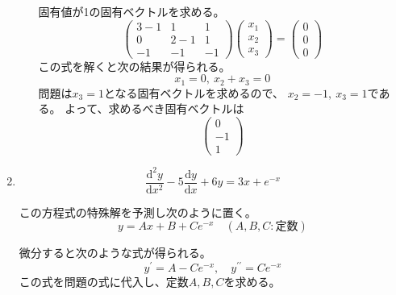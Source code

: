 \documentclass[12pt,b5paper]{ltjsarticle}
\begin{document}
\begin{enumerate}
\begin{enumerate}
            固有値が1の固有ベクトルを求める。
            \begin{equation}
             \begin{pmatrix} 3-1 & 1 & 1\\ 0 & 2-1 & 1\\ -1 & -1 & -1 \end{pmatrix}
             \begin{pmatrix}x_1\\x_2\\x_3\end{pmatrix}
              =\begin{pmatrix}0\\0\\0\end{pmatrix}
            \end{equation}
            この式を解くと次の結果が得られる。
            \begin{equation}
             x_1=0,\ x_2 + x_3 =0
            \end{equation}
            問題は$x_3 = 1$となる固有ベクトルを求めるので、
            $x_2=-1,\ x_3=1$である。
            よって、求めるべき固有ベクトルは
            \begin{equation}
             \begin{pmatrix}
              0\\-1\\1
             \end{pmatrix}
            \end{equation}

      \end{enumerate}
 \item

%
%


      \begin{equation}
       \frac{\mathrm{d}^2y}{\mathrm{d}x^2}
        -5 \frac{\mathrm{d}y}{\mathrm{d}x}
        + 6y =3x + e^{-x}
      \end{equation}

      この方程式の特殊解を予測し次のように置く。
      \begin{equation}
       y=Ax+B+Ce^{-x} \quad (A,B,C:\text{定数})
      \end{equation}

      微分すると次のような式が得られる。
      \begin{equation}
       y^{\prime} = A-Ce^{-x}, \quad
        y^{\prime\prime} = Ce^{-x}
      \end{equation}
      この式を問題の式に代入し、定数$A,B,C$を求める。


\end{enumerate}
\end{document}
